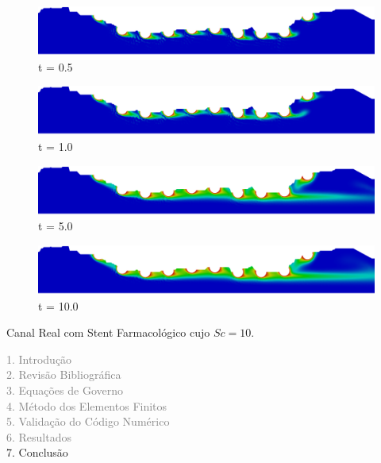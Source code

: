 \begin{frame}
\begin{figure}
\begin{minipage}{.50\linewidth}
      \centering
      \includegraphics[scale=0.077]{images/conc10_RealStrut2500.png}\\
      \scriptsize t = 0.5
     \end{minipage}%
     \begin{minipage}{.50\linewidth}
      \centering
      \includegraphics[scale=0.077]{images/conc10_RealStrut5000.png}\\
      \scriptsize t = 1.0
     \end{minipage}
     \begin{minipage}{.50\linewidth}
     \medskip
      \centering
      \includegraphics[scale=0.077]{images/conc10_RealStrut25000.png}\\
      \scriptsize t = 5.0
     \end{minipage}%
     \begin{minipage}{.50\linewidth}
     \medskip
      \centering
      \includegraphics[scale=0.077]{images/conc10_RealStrut50000.png}\\
      \scriptsize t = 10.0
     \end{minipage}
\end{figure}
\vspace{0cm}
\centering \scriptsize Canal Real com Stent Farmacológico cujo $Sc=10$.
\end{frame}


\begin{frame}
  \vspace{-1cm}
  \textcolor{gray}{1. Introdução}\\[0.1cm]
  \textcolor{gray}{2. Revisão Bibliográfica}\\[0.1cm]
  \textcolor{gray}{3. Equações de Governo}\\[0.1cm]
  \textcolor{gray}{4. Método dos Elementos Finitos}\\[0.1cm]
  \textcolor{gray}{5. Validação do Código Numérico}\\[0.1cm]
  \textcolor{gray}{6. Resultados}\\[0.1cm]
  7. Conclusão
\end{frame}



